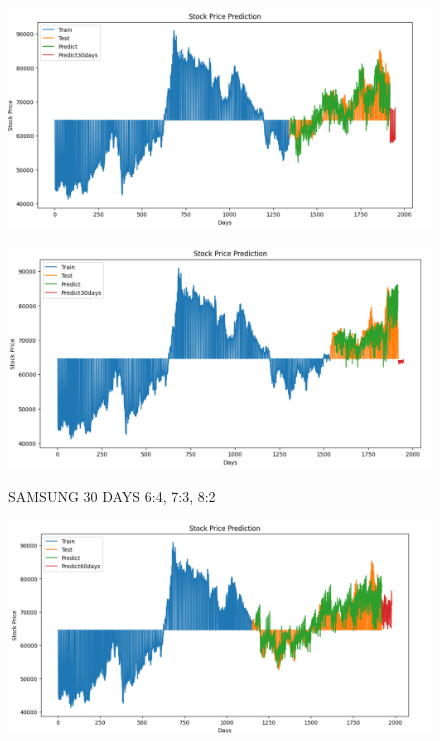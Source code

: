\documentclass{article}
\begin{document}
\begin{multicols}{2}
\begin{figure}[H]
\begin{minipage}{0.15\textwidth}
    \label{fig:1}
    \end{minipage}%
    \begin{minipage}{0.15\textwidth}
    \centering
    \includegraphics[width=1\textwidth]{Image/N_Beat/N_BEAT_7_3_SAMSUNG_30DAYS.png}
  
    \label{fig:2}
    \end{minipage}%
    \begin{minipage}{0.15\textwidth}
    \centering
    \includegraphics[width=1\textwidth]{Image/N_Beat/N_BEAT_8_2_SAMSUNG_30DAYS.png}

    \label{fig:3}
    \end{minipage}
    \caption{SAMSUNG 30 DAYS  6:4, 7:3, 8:2 }
\end{figure}


\begin{figure}[H]
    \centering
    \begin{minipage}{0.15\textwidth}
    \centering
    \includegraphics[width=1\textwidth]{Image/N_Beat/N_BEAT_6_4_SAMSUNG_60DAYS.png}
   

\end{minipage}
\end{figure}
\end{multicols}
\end{document}
